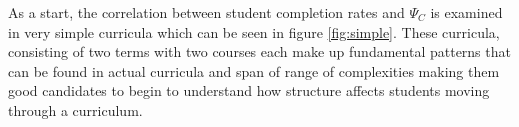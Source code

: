 \documentclass[botnum, fleqn]{unmeethesis}
\begin{document}

    As a start, the correlation between student completion rates and $\Psi_C$ is examined in very simple curricula which can be seen in figure \ref{fig:simple}. These curricula, consisting of two terms with two courses each make up fundamental patterns that can be found in actual curricula and span of range of complexities making them good candidates to begin to understand how structure affects students moving through a curriculum.
\end{document}
